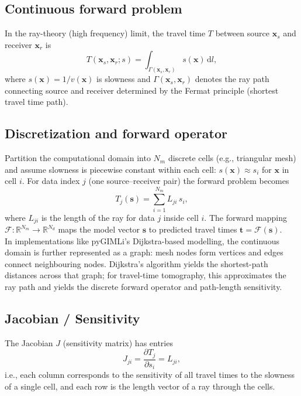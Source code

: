 \subsection*{Continuous forward problem}
In the ray-theory (high frequency) limit, the travel time $T$ between source $\mathbf{x}_s$ and receiver $\mathbf{x}_r$ is
\begin{equation}\label{eq:ray_integral}
T(\mathbf{x}_s,\mathbf{x}_r; s) = \int_{\Gamma(\mathbf{x}_s,\mathbf{x}_r)} s(\mathbf{x})\,\mathrm{d}l,
\end{equation}
where $s(\mathbf{x}) = 1/v(\mathbf{x})$ is slowness and $\Gamma(\mathbf{x}_s,\mathbf{x}_r)$ denotes the ray path connecting source and receiver determined by the Fermat principle (shortest travel time path).

\subsection*{Discretization and forward operator}
Partition the computational domain into $N_m$ discrete cells (e.g., triangular mesh) and assume slowness is piecewise constant within each cell: $s(\mathbf{x}) \approx s_i$ for $\mathbf{x}$ in cell $i$. For data index $j$ (one source--receiver pair) the forward problem becomes
\begin{equation}\label{eq:discrete_forward}
T_j(\mathbf{s}) = \sum_{i=1}^{N_m} L_{ji}\, s_i,
\end{equation}
where $L_{ji}$ is the length of the ray for data $j$ inside cell $i$. The forward mapping $\mathcal{F}:\mathbb{R}^{N_m}\to\mathbb{R}^{N_d}$ maps the model vector $\mathbf{s}$ to predicted travel times $\mathbf{t}=\mathcal{F}(\mathbf{s})$.\\
In implementations like pyGIMLi's \cite{Ruecker2017} Dijkstra-based modelling, the continuous domain is further represented as a graph: mesh nodes form vertices and edges connect neighbouring nodes. Dijkstra's algorithm yields the shortest-path distances across that graph; for travel-time tomography, this approximates the ray path and yields the discrete forward operator and path-length sensitivity.

\subsection*{Jacobian / Sensitivity}
The Jacobian $J$ (sensitivity matrix) has entries
\begin{equation}
J_{ji} = \frac{\partial T_j}{\partial s_i} = L_{ji},
\end{equation}
i.e., each column corresponds to the sensitivity of all travel times to the slowness of a single cell, and each row is the length vector of a ray through the cells.

